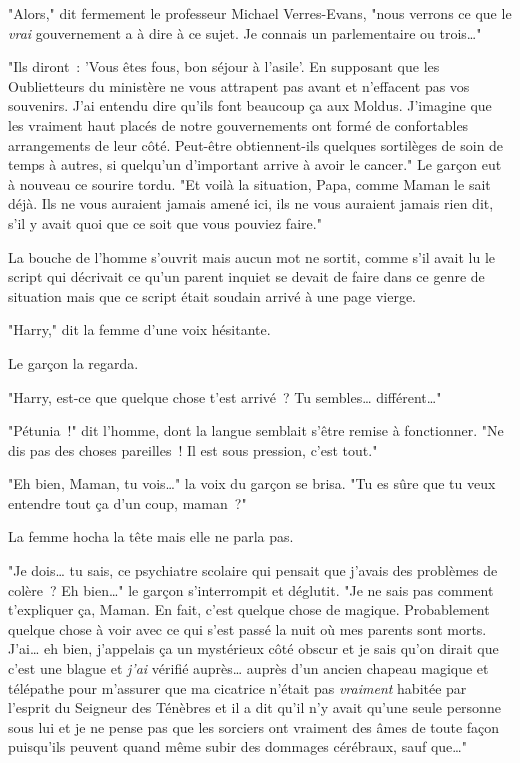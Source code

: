 "Alors," dit fermement le professeur Michael Verres-Evans, "nous verrons ce que le \emph{vrai} gouvernement a à dire à ce sujet. Je connais un parlementaire ou trois…"

"Ils diront~: 'Vous êtes fous, bon séjour à l'asile'. En supposant que les Oublietteurs du ministère ne vous attrapent pas avant et n'effacent pas vos souvenirs. J'ai entendu dire qu'ils font beaucoup ça aux Moldus. J'imagine que les vraiment haut placés de notre gouvernements ont formé de confortables arrangements de leur côté. Peut-être obtiennent-ils quelques sortilèges de soin de temps à autres, si quelqu'un d'important arrive à avoir le cancer." Le garçon eut à nouveau ce sourire tordu. "Et voilà la situation, Papa, comme Maman le sait déjà. Ils ne vous auraient jamais amené ici, ils ne vous auraient jamais rien dit, s'il y avait quoi que ce soit que vous pouviez faire."

La bouche de l'homme s'ouvrit mais aucun mot ne sortit, comme s'il avait lu le script qui décrivait ce qu'un parent inquiet se devait de faire dans ce genre de situation mais que ce script était soudain arrivé à une page vierge.

"Harry," dit la femme d'une voix hésitante.

Le garçon la regarda.

"Harry, est-ce que quelque chose t'est arrivé~? Tu sembles… différent…"

"Pétunia~!" dit l'homme, dont la langue semblait s'être remise à fonctionner. "Ne dis pas des choses pareilles~! Il est sous pression, c'est tout."

"Eh bien, Maman, tu vois…" la voix du garçon se brisa. "Tu es sûre que tu veux entendre tout ça d'un coup, maman~?"

La femme hocha la tête mais elle ne parla pas.

"Je dois… tu sais, ce psychiatre scolaire qui pensait que j'avais des problèmes de colère~? Eh bien…" le garçon s'interrompit et déglutit. "Je ne sais pas comment t'expliquer ça, Maman. En fait, c'est quelque chose de magique. Probablement quelque chose à voir avec ce qui s'est passé la nuit où mes parents sont morts. J'ai… eh bien, j'appelais ça un mystérieux côté obscur et je sais qu'on dirait que c'est une blague et \emph{j'ai} vérifié auprès… auprès d'un ancien chapeau magique et télépathe pour m'assurer que ma cicatrice n'était pas \emph{vraiment} habitée par l'esprit du Seigneur des Ténèbres et il a dit qu'il n'y avait qu'une seule personne sous lui et je ne pense pas que les sorciers ont vraiment des âmes de toute façon puisqu'ils peuvent quand même subir des dommages cérébraux, sauf que…"

